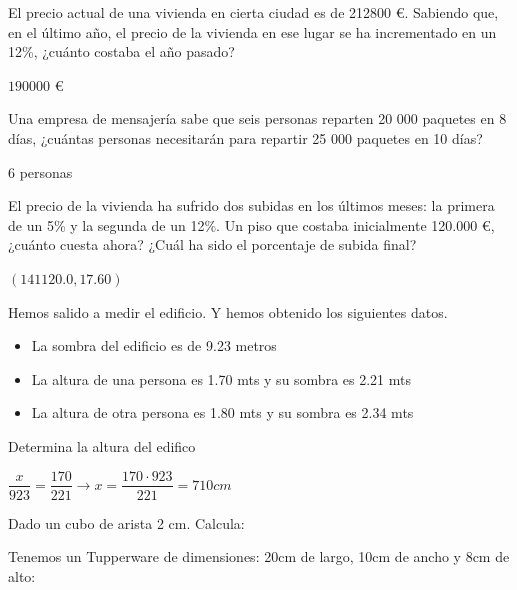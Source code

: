 \documentclass[addpoints,spanish, 12pt,a4paper]{exam}
\begin{document}
\begin{questions}

\question[2]El precio actual de una vivienda en cierta ciudad es de 212800 \euro. Sabiendo que, en el último año, el precio de la vivienda en ese lugar se ha incrementado en un 12\%, ¿cuánto costaba el año pasado?
\begin{solution}
$190000$ \euro
\end{solution}

\question[2] Una empresa de mensajería sabe que seis personas reparten 20 000 paquetes en 8 días, ¿cuántas personas necesitarán para repartir 25 000 paquetes en 10 días?
\begin{solution}
6 personas
\end{solution}

\question[2]  El precio de la vivienda ha sufrido dos subidas en los últimos meses: la primera de un 5\% y la segunda de un 12\%. Un piso que costaba inicialmente 120.000 \euro, ¿cuánto cuesta ahora? ¿Cuál ha sido el porcentaje de subida final?
\begin{solution}
$(141120.0, 17.60)$
\end{solution}



\question[2] Hemos salido a medir el edificio. Y hemos obtenido los siguientes datos.\begin{itemize}
\item La sombra del edificio es de 9.23 metros
\item La altura de una persona es 1.70 mts y su sombra es 2.21 mts
\item La altura de otra persona es 1.80 mts y su sombra es 2.34 mts
\end{itemize}
Determina la altura del edifico
\begin{solution} $\dfrac{x}{923}=\dfrac{170}{221} \to x=\dfrac{170\cdot923}{221}= 710 cm$  \end{solution}

\question Dado un cubo de arista 2 cm. Calcula:
\begin{center}
\end{center}
\question Tenemos un Tupperware de dimensiones: 20cm de largo, 10cm de ancho y 8cm de alto:
\begin{parts}

\end{parts}
\end{questions}
\end{document}
